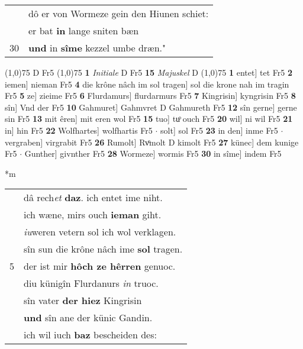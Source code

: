 \documentclass[8pt,a4paper,notitlepage]{article}
\begin{document}
\begin{table}[ht]
\begin{minipage}[t]{0.5\linewidth}
\begin{tabular}{rl}
 & dô er von Wormeze gein den Hiunen schiet:\\ 
 & er bat \textbf{in} lange sniten bæn\\ 
30 & \textbf{und} in \textbf{sîme} kezzel umbe dræn."\\ 
\end{tabular}
\scriptsize
\line(1,0){75} \newline
D Fr5 \newline
\line(1,0){75} \newline
\textbf{1} \textit{Initiale} D Fr5  \textbf{15} \textit{Majuskel} D  \newline
\line(1,0){75} \newline
\textbf{1} entet] tet Fr5 \textbf{2} iemen] nieman Fr5 \textbf{4} die krône nâch im sol tragen] sol die krone nah im tragin Fr5 \textbf{5} ze] zieime Fr5 \textbf{6} Flurdamurs] flurdarmurs Fr5 \textbf{7} Kingrisin] kyngrisin Fr5 \textbf{8} sîn] Vnd der Fr5 \textbf{10} Gahmuret] Gahmvret D Gahmureth Fr5 \textbf{12} sîn gerne] gerne sin Fr5 \textbf{13} mit êren] mit eren wol Fr5 \textbf{15} tuo] tuͦ ouch Fr5 \textbf{20} wil] ni wil Fr5 \textbf{21} in] hin Fr5 \textbf{22} Wolfhartes] wolfhartis Fr5  $\cdot$ solt] sol Fr5 \textbf{23} in den] inme Fr5  $\cdot$ vergraben] virgrabit Fr5 \textbf{26} Rumolt] Rvͦmolt D kimolt Fr5 \textbf{27} künec] dem kunige Fr5  $\cdot$ Gunther] givnther Fr5 \textbf{28} Wormeze] wormis Fr5 \textbf{30} in sîme] indem Fr5 \newline
\end{minipage}
\hspace{0.5cm}
\begin{minipage}[t]{0.5\linewidth}
\small
\begin{center}*m
\end{center}
\begin{tabular}{rl}
 & dâ rech\textit{et} \textbf{daz}. ich entet ime niht.\\ 
 & ich wæne, mirs ouch \textbf{ieman} giht.\\ 
 & \textit{iu}weren vetern sol ich wol verklagen.\\ 
 & sîn sun die krône nâch ime \textbf{sol} tragen.\\ 
5 & der ist mir \textbf{hôch ze hêrren} genuoc.\\ 
 & diu künigîn Flurdanurs \textit{in} truoc.\\ 
 & sîn vater \textbf{der hiez} Kingrisin\\ 
 & \textbf{und} sîn ane der künic Gandin.\\ 
 & ich wil iuch \textbf{baz} bescheiden des:\\ 

\end{tabular}
\end{minipage}
\end{table}
\end{document}
